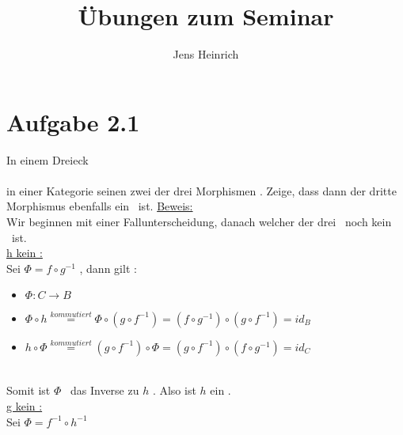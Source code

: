 \documentclass{article}
\title{\"Ubungen zum Seminar \boldfont{Kategorientheorie} }
\author{Jens Heinrich}
\begin{document}
 

\section*{Aufgabe 2.1}
	In einem Dreieck 
	\\
	
	\\
	in einer Kategorie seinen zwei der drei Morphismen \Ison.
	Zeige, dass dann der dritte Morphismus ebenfalls ein \Iso \ ist.
	\underline{Beweis:} \\
		Wir beginnen mit einer Fallunterscheidung, danach welcher der drei \Morn \ noch kein \Iso \ ist.
		\\
		\underline{h kein \Iso :}
		\\
		Sei 
		\begin{math}
			\Phi=f \circ g^{-1}
		\end{math}		
		, dann gilt :
		\begin{itemize}
			\item 
				\begin{math}
					\Phi : C \to B
				\end{math}
			\item
				\begin{math}
					\Phi \circ h \overset{ kommutiert}{=}
					\Phi \circ \left( 
						g \circ f^{-1} 
						\right) =
					\left( f \circ g^{-1} \right) 
					\circ 
					\left( g \circ f^{-1} \right)= 
					id_{B}
				\end{math}
			\item
				\begin{math}
					h \circ \Phi \overset{ kommutiert}{=}
					\left( 
						g \circ f^{-1}
						\right) \circ \Phi =
					\left( g \circ f^{-1} \right)
					\circ
					\left( f \circ g^{-1} \right)=
					id_{C}
				\end{math}
		\end{itemize}
		\\
		Somit ist 
		\begin{math}
			\Phi
		\end{math}
		\ das Inverse zu 
		\begin{math}
			h
		\end{math}
		. 
		Also ist 
		\begin{math}
			h
		\end{math}
		ein \Iso. 
		\\
		\underline {g kein \Iso :}
		\\
		Sei 
		\begin{math}
			\Phi=f^{-1} \circ h^{-1}
		\end{math}		
\end{document}
